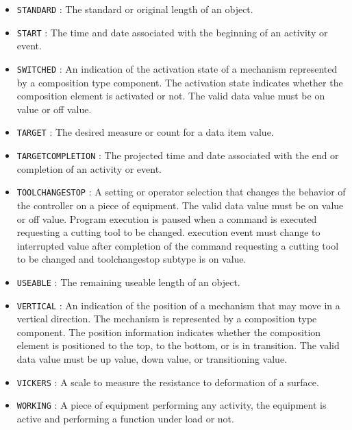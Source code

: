 \begin{itemize}
\item \texttt{STANDARD} : The standard or original length of an object. 

\item \texttt{START} : The time and date associated with the beginning of an activity or event. 

\item \texttt{SWITCHED} : An indication of the activation state of a mechanism represented by a composition type component.
 The activation state indicates whether the composition element is activated or not.
 The valid data value must be on value or off value. 

\item \texttt{TARGET} : The desired measure or count for a data item value. 

\item \texttt{TARGET\textunderscore COMPLETION} : The projected time and date associated with the end or completion of an activity or event. 

\item \texttt{TOOL\textunderscore CHANGE\textunderscore STOP} : A setting or operator selection that changes the behavior of the controller on a piece of equipment. 
 The valid data value must be on value or off value. 
 Program execution is paused when a command is executed requesting a cutting tool to be changed. 
 execution event must change to interrupted value after completion of the command requesting a cutting tool to be changed and toolchangestop subtype is on value. 

\item \texttt{USEABLE} : The remaining useable length of an object. 

\item \texttt{VERTICAL} : An indication of the position of a mechanism that may move in a vertical direction. The mechanism is represented by a composition type component. 
 The position information indicates whether the composition element is positioned to the top, to the bottom, or is in transition.  
 The valid data value must be up value, down value, or transitioning value. 

\item \texttt{VICKERS} : A scale to measure the resistance to deformation of a surface. 

\item \texttt{WORKING} : A piece of equipment performing any activity, the equipment is active and performing a function under load or not. 


\end{itemize}
